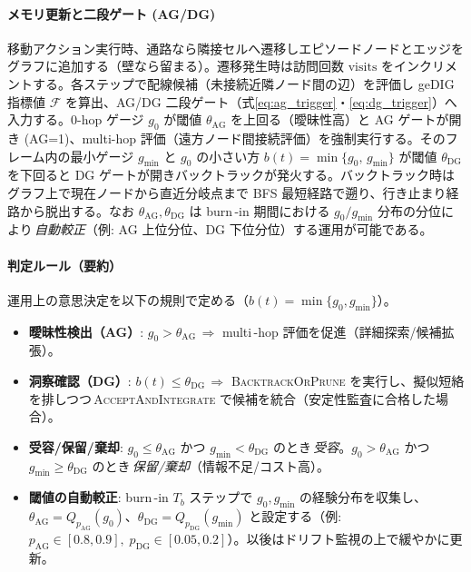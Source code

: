 \documentclass[ja=standard,xelatex]{bxjsarticle}
\begin{document}
\paragraph{メモリ更新と二段ゲート (AG/DG)}
移動アクション実行時、通路なら隣接セルへ遷移しエピソードノードとエッジをグラフに追加する（壁なら留まる）。遷移発生時は訪問回数 $\mathrm{visits}$ をインクリメントする。各ステップで配線候補（未接続近隣ノード間の辺）を評価し geDIG 指標値 $\mathcal{F}$ を算出、AG/DG 二段ゲート（式\ref{eq:ag_trigger}・\ref{eq:dg_trigger}）へ入力する。0-hop ゲージ $g_0$ が閾値 $\theta_{\mathrm{AG}}$ を上回る（曖昧性高）と AG ゲートが開き (AG=1)、multi-hop 評価（遠方ノード間接続評価）を強制実行する。そのフレーム内の最小ゲージ $g_{\min}$ と $g_0$ の小さい方 $b(t)=\min\{g_0,\,g_{\min}\}$ が閾値 $\theta_{\mathrm{DG}}$ を下回ると DG ゲートが開きバックトラックが発火する。バックトラック時はグラフ上で現在ノードから直近分岐点まで BFS 最短経路で遡り、行き止まり経路から脱出する。なお $\theta_{\mathrm{AG}},\theta_{\mathrm{DG}}$ は burn\,\mbox{-}in 期間における $g_0/g_{\min}$ 分布の分位により\,\emph{自動較正}（例: AG 上位分位、DG 下位分位）する運用が可能である。

\paragraph{判定ルール（要約）}
運用上の意思決定を以下の規則で定める（$b(t){=}\min\{g_0, g_{\min}\}$）。
\begin{itemize}
  \item \textbf{曖昧性検出（AG）}: $g_0 > \theta_{\mathrm{AG}}$\;\,$\Rightarrow$\; multi\,\mbox{-}hop 評価を促進（詳細探索/候補拡張）。
  \item \textbf{洞察確認（DG）}: $b(t) \le \theta_{\mathrm{DG}}$\;\,$\Rightarrow$\; \textsc{BacktrackOrPrune} を実行し、擬似短絡を排しつつ\,\textsc{AcceptAndIntegrate} で候補を統合（安定性監査に合格した場合）。
  \item \textbf{受容/保留/棄却}: $g_0 \le \theta_{\mathrm{AG}}$ かつ $g_{\min} < \theta_{\mathrm{DG}}$ のとき\,\emph{受容}。$g_0 > \theta_{\mathrm{AG}}$ かつ $g_{\min} \ge \theta_{\mathrm{DG}}$ のとき\,\emph{保留/棄却}（情報不足/コスト高）。
  \item \textbf{閾値の自動較正}: burn\,\mbox{-}in $T_b$ ステップで $g_0, g_{\min}$ の経験分布を収集し、$\theta_{\mathrm{AG}}{=}Q_{p_{\mathrm{AG}}}(g_0)$、$\theta_{\mathrm{DG}}{=}Q_{p_{\mathrm{DG}}}(g_{\min})$ と設定する（例: $p_{\mathrm{AG}}\in[0.8,0.9],\; p_{\mathrm{DG}}\in[0.05,0.2]$）。以後はドリフト監視の上で緩やかに更新。
\end{itemize}
\end{document}
